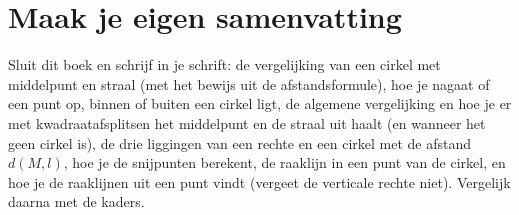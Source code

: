 \begin{oefeningen}




















\end{oefeningen}


\begin{oefeningen}






\end{oefeningen}


\ifzelfstudie
\section*{Maak je eigen samenvatting}
Sluit dit boek en schrijf in je schrift: de vergelijking van een cirkel met middelpunt en straal (met het bewijs uit de afstandsformule), hoe je nagaat of een punt op, binnen of buiten een cirkel ligt, de algemene vergelijking en hoe je er met kwadraatafsplitsen het middelpunt en de straal uit haalt (en wanneer het geen cirkel is), de drie liggingen van een rechte en een cirkel met de afstand $d(M, l)$, hoe je de snijpunten berekent, de raaklijn in een punt van de cirkel, en hoe je de raaklijnen uit een punt vindt (vergeet de verticale rechte niet). Vergelijk daarna met de kaders.
\fi
